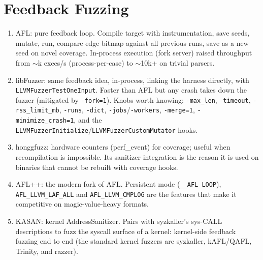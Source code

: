 \documentclass[12pt]{Training}
\begin{document}
\section*{Feedback Fuzzing}
\begin{enumerate}
	\item AFL: pure feedback loop. Compile target with instrumentation, save seeds, mutate, run, compare edge bitmap against all previous runs, save as a new seed on novel coverage. In-process execution (fork server) raised throughput from $\sim$k execs/s (process-per-case) to $\sim$10k+ on trivial parsers.
	\item libFuzzer: same feedback idea, in-process, linking the harness directly, with \lstinline{LLVMFuzzerTestOneInput}. Faster than AFL but any crash takes down the fuzzer (mitigated by \lstinline{-fork=1}). Knobs worth knowing: \lstinline{-max_len}, \lstinline{-timeout}, \lstinline{-rss_limit_mb}, \lstinline{-runs}, \lstinline{-dict}, \lstinline{-jobs}/\lstinline{-workers}, \lstinline{-merge=1}, \lstinline{-minimize_crash=1}, and the \lstinline{LLVMFuzzerInitialize}/\lstinline{LLVMFuzzerCustomMutator} hooks.
	\item honggfuzz: hardware counters (perf\_event) for coverage; useful when recompilation is impossible. Its sanitizer integration is the reason it is used on binaries that cannot be rebuilt with coverage hooks.
	\item AFL++: the modern fork of AFL. Persistent mode (\lstinline{__AFL_LOOP}), \lstinline{AFL_LLVM_LAF_ALL} and \lstinline{AFL_LLVM_CMPLOG} are the features that make it competitive on magic-value-heavy formats.
	\item KASAN: kernel AddressSanitizer. Pairs with syzkaller's sys-CALL descriptions to fuzz the syscall surface of a kernel: kernel-side feedback fuzzing end to end (the standard kernel fuzzers are syzkaller, kAFL/QAFL, Trinity, and razzer).
\end{enumerate}
\end{document}
